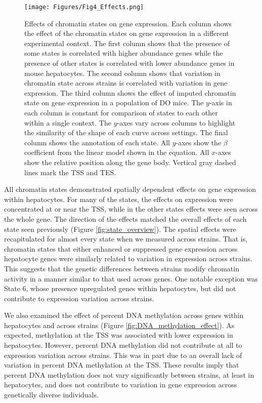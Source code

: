 \documentclass[
  11pt,
]{article}
\begin{document}
\begin{figure}[ht!]
\texttt{[image: Figures/Fig4\_Effects.png]}
\caption{Effects of chromatin states on gene expression. Each column shows 
the effect of the chromatin states on gene expression in a different 
experimental context. The first column shows that the presence of some
states is correlated with higher abundance genes while the presence of
other states is correlated with lower abundance genes in mouse hepatocytes. 
The second column shows that variation in chromatin state across strains
is correlated with variation in gene expression. The third column 
shows the effect of imputed chromatin state on gene expression in a 
population of DO mice. The $y$-axis in each column is constant for comparison
of states to each other within a single context. The $y$-axes vary across
columns to highlight the similarity of the shape of each curve across 
settings. The final column shows the annotation of each state. All $y$-axes 
show the $\beta$ coefficient from the linear model shown in the equation. 
All $x$-axes show the relative position along the gene body. Vertical gray 
dashed lines mark the TSS and TES.}
\label{fig:state_effects}
\end{figure}

All chromatin states demonstrated spatially dependent effects on gene
expression within hepatocytes. For many of the states, the effects on
expression were concentrated at or near the TSS, while in the other
states effects were seen across the whole gene. The direction of the
effects matched the overall effects of each state seen previously
(Figure \ref{fig:state_overview}). The spatial effects were
recapitulated for almost every state when we measured across strains.
That is, chromatin states that either enhanced or suppressed gene
expression across hepatocyte genes were similarly related to variation
in expression across strains. This suggests that the genetic differences
between strains modify chromatin activity in a manner similar to that
used across genes. One notable exception was State 6, whose presence
upregulated genes within hepatocytes, but did not contribute to
expression variation across strains.

We also examined the effect of percent DNA methylation across genes
within hepatocytes and across strains (Figure
\ref{fig:DNA_methylation_effect}). As expected, methylation at the TSS
was associated with lower expression in hepatocytes. However, percent
DNA methylation did not contribute at all to expression variation across
strains. This was in part due to an overall lack of variation in percent
DNA methylation at the TSS. These results imply that percent DNA
methylation does not vary significantly between strains, at least in
hepatocytes, and does not contribute to variation in gene expression
across genetically diverse individuals.
\end{document}
